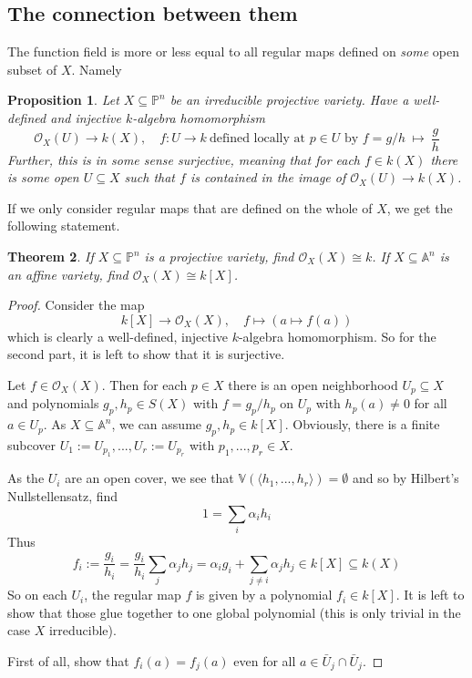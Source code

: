 \documentclass{scrartcl}
\newcommand{\V}{\mathbb{V}}
\newtheorem{prop}{Proposition}[section]
\newtheorem{theorem}[prop]{Theorem}
\theoremstyle{definition}
\begin{document}
\subsection{The connection between them}
The function field is more or less equal to all regular maps defined on \emph{some} open subset of $X$. Namely
\begin{prop}
    Let $X \subseteq \mathbb{P}^n$ be an irreducible projective variety.
    Have a well-defined and injective $k$-algebra homomorphism
    \begin{equation*}
        \mathcal{O}_X(U) \to k(X), \quad f: U \to k \ \text{defined locally at $p \in U$ by $f = g/h$} \ \mapsto \ \frac g h
    \end{equation*}
    Further, this is in some sense surjective, meaning that for each $f \in k(X)$ there is some open $U \subseteq X$ such that $f$ is contained in the image of $\mathcal{O}_X(U) \to k(X)$.
\end{prop}
If we only consider regular maps that are defined on the whole of $X$, we get the following statement.
\begin{theorem}
    If $X \subseteq \mathbb{P}^n$ is a projective variety, find $\mathcal{O}_X(X) \cong k$.
    If $X \subseteq \mathbb{A}^n$ is an affine variety, find $\mathcal{O}_X(X) \cong k[X]$.
\end{theorem}
\begin{proof}
    Consider the map
    \begin{equation*}
        k[X] \to \mathcal{O}_X(X), \quad f \mapsto (a \mapsto f(a))
    \end{equation*}
    which is clearly a well-defined, injective $k$-algebra homomorphism.
    So for the second part, it is left to show that it is surjective.

    Let $f \in \mathcal{O}_X(X)$.
    Then for each $p \in X$ there is an open neighborhood $U_p \subseteq X$ and polynomials $g_p, h_p \in S(X)$ with $f = g_p/h_p$ on $U_p$ with $h_p(a) \neq 0$ for all $a \in U_p$.
    As $X \subseteq \mathbb{A}^n$, we can assume $g_p, h_p \in k[X]$.
    Obviously, there is a finite subcover $U_1 := U_{p_1}, ..., U_r := U_{p_r}$ with $p_1, ..., p_r \in X$.

    As the $U_i$ are an open cover, we see that $\V(\langle h_1, ..., h_r \rangle) = \emptyset$ and so by Hilbert's Nullstellensatz, find
    \begin{equation*}
        1 = \sum_i \alpha_i h_i
    \end{equation*}
    Thus
    \begin{equation*}
        f_i := \frac {g_i} {h_i} = \frac {g_i} {h_i} \sum_j \alpha_j h_j = \alpha_i g_i + \sum_{j \neq i} \alpha_j h_j \in k[X] \subseteq k(X)
    \end{equation*}
    So on each $U_i$, the regular map $f$ is given by a polynomial $f_i \in k[X]$.
    It is left to show that those glue together to one global polynomial (this is only trivial in the case $X$ irreducible).

    First of all, show that $f_i(a) = f_j(a)$ even for all $a \in \bar{U}_j \cap \bar{U}_j$.
\end{proof}
\end{document}
